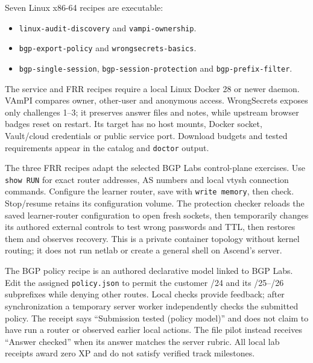 Seven Linux x86-64 recipes are executable:
\begin{itemize}
\item \texttt{linux-audit-discovery} and \texttt{vampi-ownership}.
\item \texttt{bgp-export-policy} and \texttt{wrongsecrets-basics}.
\item \texttt{bgp-single-session}, \texttt{bgp-session-protection}
and \texttt{bgp-prefix-filter}.
\end{itemize}
The service and FRR recipes require a local Linux
Docker 28 or newer daemon. VAmPI compares owner, other-user and anonymous access.
WrongSecrets exposes only challenges 1--3; it preserves answer files and notes,
while upstream browser badges reset on restart. Its target has no host mounts,
Docker socket, Vault/cloud credentials or public service port. Download budgets
and tested requirements appear in the catalog and \texttt{doctor} output.

The three FRR recipes adapt the selected BGP Labs control-plane exercises.
Use \texttt{show RUN} for exact router addresses, AS numbers and local vtysh
connection commands. Configure the learner router, save with \texttt{write memory},
then check. Stop/resume retains its configuration volume. The protection checker
reloads the saved learner-router configuration to open fresh sockets, then
temporarily changes its authored external controls to test wrong passwords and
TTL, then restores them and observes recovery. This is a private container
topology without kernel routing; it does not run netlab or create a general shell
on Ascend's server.

The BGP policy recipe is an authored declarative model linked to BGP Labs. Edit
the assigned \texttt{policy.json} to permit the customer /24 and its /25--/26
subprefixes while denying other routes. Local checks provide feedback; after
synchronization a temporary server worker independently checks the submitted
policy. The receipt says ``Submission tested (policy model)'' and does not claim
to have run a router or observed earlier local actions. The file pilot instead
receives ``Answer checked'' when its answer matches the server rubric. All local
lab receipts award zero XP and do not satisfy verified track milestones.


